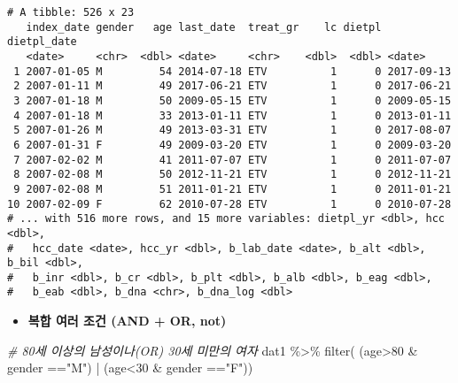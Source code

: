 \documentclass[
]{article}
\newenvironment{Shaded}{\begin{snugshade}}{\end{snugshade}}
\newcommand{\CommentTok}[1]{\textcolor[rgb]{0.56,0.35,0.01}{\textit{#1}}}
\newcommand{\DecValTok}[1]{\textcolor[rgb]{0.00,0.00,0.81}{#1}}
\newcommand{\FunctionTok}[1]{\textcolor[rgb]{0.00,0.00,0.00}{#1}}
\newcommand{\NormalTok}[1]{#1}
\newcommand{\SpecialCharTok}[1]{\textcolor[rgb]{0.00,0.00,0.00}{#1}}
\newcommand{\StringTok}[1]{\textcolor[rgb]{0.31,0.60,0.02}{#1}}
\providecommand{\tightlist}{%
  \setlength{\itemsep}{0pt}\setlength{\parskip}{0pt}}
\begin{document}
\begin{verbatim}
# A tibble: 526 x 23
   index_date gender   age last_date  treat_gr    lc dietpl dietpl_date
   <date>     <chr>  <dbl> <date>     <chr>    <dbl>  <dbl> <date>     
 1 2007-01-05 M         54 2014-07-18 ETV          1      0 2017-09-13 
 2 2007-01-11 M         49 2017-06-21 ETV          1      0 2017-06-21 
 3 2007-01-18 M         50 2009-05-15 ETV          1      0 2009-05-15 
 4 2007-01-18 M         33 2013-01-11 ETV          1      0 2013-01-11 
 5 2007-01-26 M         49 2013-03-31 ETV          1      0 2017-08-07 
 6 2007-01-31 F         49 2009-03-20 ETV          1      0 2009-03-20 
 7 2007-02-02 M         41 2011-07-07 ETV          1      0 2011-07-07 
 8 2007-02-08 M         50 2012-11-21 ETV          1      0 2012-11-21 
 9 2007-02-08 M         51 2011-01-21 ETV          1      0 2011-01-21 
10 2007-02-09 F         62 2010-07-28 ETV          1      0 2010-07-28 
# ... with 516 more rows, and 15 more variables: dietpl_yr <dbl>, hcc <dbl>,
#   hcc_date <date>, hcc_yr <dbl>, b_lab_date <date>, b_alt <dbl>, b_bil <dbl>,
#   b_inr <dbl>, b_cr <dbl>, b_plt <dbl>, b_alb <dbl>, b_eag <dbl>,
#   b_eab <dbl>, b_dna <chr>, b_dna_log <dbl>
\end{verbatim}

\begin{itemize}
\tightlist
\item
  \textbf{복합 여러 조건 (AND + OR, not)}
\end{itemize}

\begin{Shaded}
\begin{Highlighting}[]
\CommentTok{\# 80세 이상의 남성이나(OR) 30세 미만의 여자}
\NormalTok{dat1 }\SpecialCharTok{\%\textgreater{}\%} 
  \FunctionTok{filter}\NormalTok{( (age}\SpecialCharTok{\textgreater{}}\DecValTok{80} \SpecialCharTok{\&}\NormalTok{ gender }\SpecialCharTok{==}\StringTok{"M"}\NormalTok{) }\SpecialCharTok{|}\NormalTok{ (age}\SpecialCharTok{\textless{}}\DecValTok{30} \SpecialCharTok{\&}\NormalTok{ gender }\SpecialCharTok{==}\StringTok{"F"}\NormalTok{)) }
\end{Highlighting}
\end{Shaded}
\end{document}
